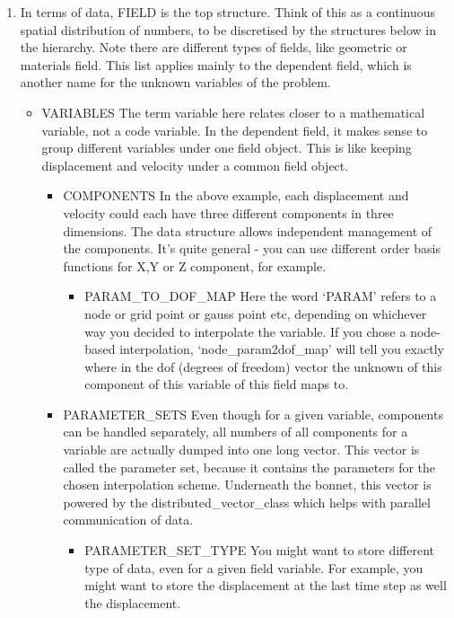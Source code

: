 \begin{enumerate} %
\item In terms of data, \textsf{FIELD} is the top structure. Think of this as a continuous spatial 
distribution of numbers, to be discretised by the structures below in the hierarchy. Note there are different
types of fields, like geometric or materials field. This list applies mainly to the dependent field, which 
is another name for the unknown variables of the problem.
  \begin{itemize}%
  \item \textsf{VARIABLES} The term variable here relates closer to a mathematical variable, not a code variable.
  In the dependent field, it makes sense to group different variables under one field object. This is like 
  keeping displacement and velocity under a common field object.
    \begin{itemize} %
    \item \textsf{COMPONENTS} In the above example, each displacement and velocity could each have three
    different components in three dimensions. The data structure allows independent management of the components.
    It's quite general - you can use different order basis functions for X,Y or Z component, for example.
      \begin{itemize} %
      \item \textsf{PARAM\_TO\_DOF\_MAP} Here the word `PARAM' refers to a node or grid point or gauss point etc, 
      depending on whichever way you decided to interpolate the variable. If you chose a node-based interpolation, 
      `node\_param2dof\_map' will tell you exactly where in the dof (degrees of freedom) vector the unknown of this 
      component of this variable of this field maps to.
      \end{itemize} %
    \item \textsf{PARAMETER\_SETS} Even though for a given variable, components can be handled separately, 
    all numbers of all components for a variable are actually dumped into one long vector. This vector is called
    the parameter set, because it contains the parameters for the chosen interpolation scheme. Underneath the bonnet, 
    this vector is powered by the distributed\_vector\_class which helps with parallel communication of data.
      \begin{itemize} %
      \item \textsf{PARAMETER\_SET\_TYPE} You might want to store different type of data, even for a given field 
      variable. For example, you might want to store the displacement at the last time step as well the displacement.

\end{itemize}
\end{itemize}
\end{itemize}
\end{enumerate}
